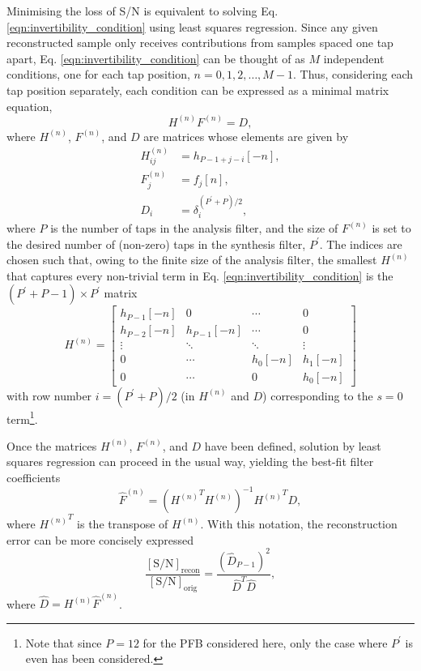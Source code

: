 \documentclass{pasa}%
\begin{document}
Minimising the loss of S/N is equivalent to solving Eq. \eqref{eqn:invertibility_condition} using least squares regression.
Since any given reconstructed sample only receives contributions from samples spaced one tap apart, Eq. \eqref{eqn:invertibility_condition} can be thought of as $M$ independent conditions, one for each tap position, $n = 0, 1, 2, \dots, M-1$.
Thus, considering each tap position separately, each condition can be expressed as a minimal matrix equation,
\begin{equation}
    H^{(n)}F^{(n)} = D,
\end{equation}
where $H^{(n)}$, $F^{(n)}$, and $D$ are matrices whose elements are given by
\begin{equation}
    \begin{aligned}
        H^{(n)}_{ij} &= h_{P-1+j-i}[-n], \\
        F^{(n)}_j    &= f_j[n], \\
        D_i          &= \delta^{(P^\prime+P)/2}_i,
    \end{aligned}
\end{equation}
where $P$ is the number of taps in the analysis filter, and the size of $F^{(n)}$ is set to the desired number of (non-zero) taps in the synthesis filter, $P^\prime$.
The indices are chosen such that, owing to the finite size of the analysis filter, the smallest $H^{(n)}$ that captures every non-trivial term in Eq. \eqref{eqn:invertibility_condition} is the $(P^\prime+P-1) \times P^\prime$ matrix
\begin{equation}
    H^{(n)} =
    \begin{bmatrix}
       h_{P-1}[-n] & 0 & \cdots & 0 \\
       h_{P-2}[-n] & h_{P-1}[-n] & \cdots & 0 \\
       \vdots & \ddots & \ddots & \vdots \\
       0 & \cdots & h_0[-n] & h_1[-n] \\
       0 & \cdots & 0 & h_0[-n]
    \end{bmatrix}
\end{equation}
with row number $i = (P^\prime + P)/2$ (in $H^{(n)}$ and $D$) corresponding to the $s = 0$ term\footnote{Note that since $P = 12$ for the PFB considered here, only the case where $P^\prime$ is even has been considered.}.

Once the matrices $H^{(n)}$, $F^{(n)}$, and $D$ have been defined, solution by least squares regression can proceed in the usual way, yielding the best-fit filter coefficients
\begin{equation}
    \hat{F}^{(n)} = \left({H^{(n)}}^T H^{(n)}\right)^{-1} {H^{(n)}}^T D,
\end{equation}
where ${H^{(n)}}^T$ is the transpose of $H^{(n)}$.
With this notation, the reconstruction error can be more concisely expressed
\begin{equation}
    \frac{[\text{S/N}]_\text{recon}}{[\text{S/N}]_\text{orig}}
      = \frac{(\hat{D}_{P-1})^2}{\hat{D}^T \hat{D}},
    \label{eqn:snr_short}
\end{equation}
where $\hat{D} = H^{(n)} \hat{F}^{(n)}$.
\end{document}
